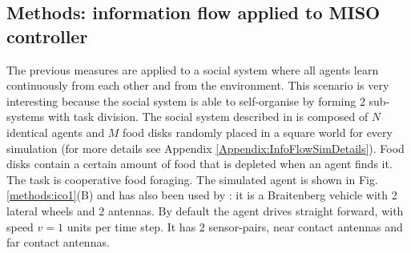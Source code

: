 \subsection{Methods: information flow applied to MISO controller}
The previous measures are applied to a social system where all agents learn continuously
from each other and from the environment. This scenario is very interesting because
the social system is able to self-organise by forming 2 sub-systems with task division.
The social system described in \citet{DiProdiMultiAgent} is composed of $N$
identical agents and $M$ food disks randomly placed in a square world for
every simulation (for more details see Appendix \ref{Appendix:InfoFlowSimDetails}).
Food disks contain a certain amount of food that is depleted
when an agent finds it. The task is cooperative food foraging.
The simulated agent is shown in Fig.\ref{methods:ico1}(B) and has also been used
by \citet{Kulvicius2009:analysisdifferential}:
it is a Braitenberg \citep{Braitenberg84} vehicle with 2
lateral wheels and 2 antennas. By default the agent drives straight forward,
with speed $v=1$ units per time step. It has 2 sensor-pairs, near contact
antennas and far contact antennas.

